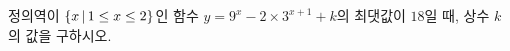 정의역이 $\{x\mkern3mu |\mkern3mu 1\le x\le 2\}$인 함수 $y=9^x-2\times 3^{x+1}+k$의 최댓값이 $18$일 때, 상수 $k$의 값을 구하시오.

